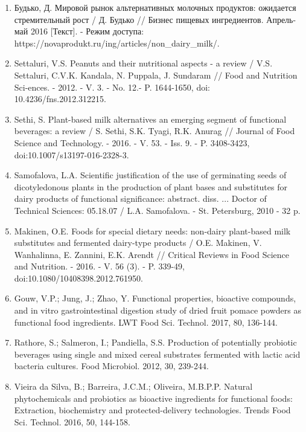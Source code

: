 \begin{enumerate}
\item
Будько, Д. Мировой рынок альтернативных молочных продуктов: ожидается
стремительный рост / Д. Будько // Бизнес пищевых ингредиентов.
Апрель-май 2016 {[}Текст{]}. - Режим доступа:
https://novaprodukt.ru/ing/articles/non\_dairy\_milk/.

\item
Settaluri, V.S. Peanuts and their nutritional aspects - a review /
V.S. Settaluri, C.V.K. Kandala, N. Puppala, J. Sundaram // Food and
Nutrition Sci-ences. - 2012. - V. 3. - No. 12.- P. 1644-1650, doi:
10.4236/fns.2012.312215.

\item
Sethi, S. Plant-based milk alternatives an emerging segment of
functional beverages: a review / S. Sethi, S.K. Tyagi, R.K. Anurag //
Journal of Food Science and Technology. - 2016. - V. 53. - Iss. 9. -
P. 3408-3423, doi:10.1007/s13197-016-2328-3.

\item
Samofalova, L.A. Scientific justification of the use of germinating
seeds of dicotyledonous plants in the production of plant bases and
substitutes for dairy products of functional significance: abstract.
diss. ... Doctor of Technical Sciences: 05.18.07 / L.A. Samofalova. -
St. Petersburg, 2010 - 32 p.

\item
Makinen, O.E. Foods for special dietary needs: non-dairy plant-based
milk substitutes and fermented dairy-type products / O.E. Makinen, V.
Wanhalinna, E. Zannini, E.K. Arendt // Critical Reviews in Food Science
and Nutrition. - 2016. - V. 56 (3). - P. 339-49,
doi:10.1080/10408398.2012.761950.

\item
Gouw, V.P.; Jung, J.; Zhao, Y. Functional properties, bioactive
compounds, and in vitro gastrointestinal digestion study of dried fruit
pomace powders as functional food ingredients. LWT Food Sci. Technol.
2017, 80, 136-144.

\item
Rathore, S.; Salmeron, I.; Pandiella, S.S. Production of potentially
probiotic beverages using single and mixed cereal substrates fermented
with lactic acid bacteria cultures. Food Microbiol. 2012, 30, 239-244.

\item
Vieira da Silva, B.; Barreira, J.C.M.; Oliveira, M.B.P.P. Natural
phytochemicals and probiotics as bioactive ingredients for functional
foods: Extraction, biochemistry and protected-delivery technologies.
Trends Food Sci. Technol. 2016, 50, 144-158.


\end{enumerate}
